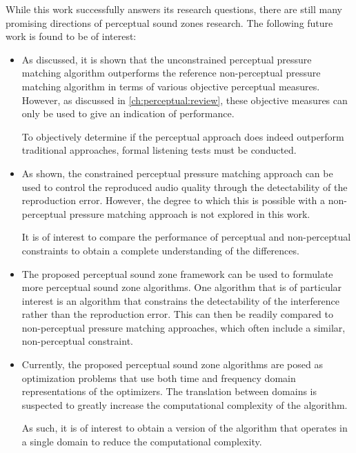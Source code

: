While this work successfully answers its research questions, 
there are still many promising directions of perceptual sound zones research.
The following future work is found to be of interest:
\begin{itemize}
    \item As discussed, it is shown that the unconstrained perceptual pressure matching algorithm outperforms 
        the reference non-perceptual pressure matching algorithm in terms of various objective perceptual measures.
        However, as discussed in \autoref{ch:perceptual:review}, 
        these objective measures can only be used to give an indication of performance.

        To objectively determine if the perceptual approach does indeed outperform traditional approaches, 
        formal listening tests must be conducted.

    \item As shown, the constrained perceptual pressure matching approach can be used to control the reproduced audio quality through the detectability of the reproduction error.
        However, the degree to which this is possible with a non-perceptual pressure matching approach is not explored in this work.

        It is of interest to compare the performance of perceptual and non-perceptual constraints to obtain a complete understanding of the differences.

    \item The proposed perceptual sound zone framework can be used to formulate more perceptual sound zone 
        algorithms.
        One algorithm that is of particular interest is an algorithm that constrains the detectability of 
        the interference rather than the reproduction error. 
        This can then be readily compared to non-perceptual pressure matching approaches, which often 
        include a similar, non-perceptual constraint.

    \item Currently, the proposed perceptual sound zone algorithms are posed as optimization problems that use both time and frequency domain representations of the optimizers.
        The translation between domains is suspected to greatly increase the computational complexity of the algorithm.

        As such, it is of interest to obtain a version of the algorithm that operates in a single domain to reduce the computational complexity. 
\end{itemize}
